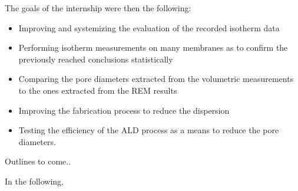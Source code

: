 \documentclass[../thesis.tex]{subfiles}
\begin{document}
    The goals of the internship were then the following:
    \begin{itemize}
      \item Improving and systemizing the evaluation of the recorded isotherm data
      \item Performing isotherm measurements on many membranes as to confirm the previously reached conclusions statistically
      \item Comparing the pore diameters extracted from the volumetric measurements to the ones extracted from the REM results
      \item Improving the fabrication process to reduce the dispersion
      \item Testing the efficiency of the ALD process as a means to reduce the pore diameters.
    \end{itemize}

    \medskip

    Outlines to come..

    In the following,
\end{document}
